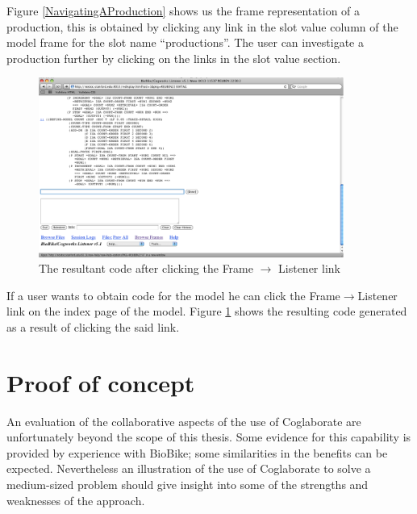 Figure \ref{NavigatingAProduction} shows us the frame representation
of a production, this is obtained by clicking any link in the slot
value column of the model frame for the slot name ``productions''. The
user can investigate a production further by clicking on the links in
the slot value section. 

\begin{figure}[htp]
  \centering
  \includegraphics[width=100mm]{ConvertFrameToImage}
  \caption{The resultant code after clicking the Frame $\rightarrow$ Listener
    link}
  \label{ConvertFrameToImage}
\end{figure}

If a user wants to obtain code for the model he can click the
Frame$\rightarrow$Listener link on the index page of the model. Figure
\ref{ConvertFrameToImage} shows the resulting code generated as a
result of clicking the said link.


\section{Proof of concept}

An evaluation of the collaborative aspects of the use of Coglaborate
are unfortunately beyond the scope of this thesis.  Some evidence for
this capability is provided by experience with BioBike; some
similarities in the benefits can be expected.  Nevertheless an
illustration of the use of Coglaborate to solve a medium-sized problem
should give insight into some of the strengths and weaknesses of the
approach.
